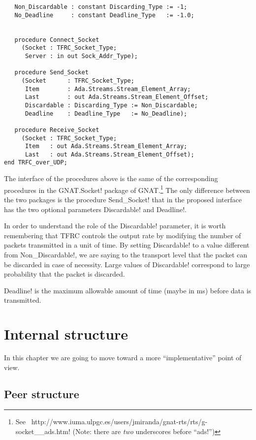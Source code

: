 \documentclass{medusabook}
\begin{document}
\begin{subappendices}
\begin{verbatim}
   Non_Discardable : constant Discarding_Type := -1;
   No_Deadline     : constant Deadline_Type   := -1.0;


   procedure Connect_Socket
     (Socket : TFRC_Socket_Type;
      Server : in out Sock_Addr_Type);

   procedure Send_Socket
     (Socket      : TFRC_Socket_Type;
      Item        : Ada.Streams.Stream_Element_Array;
      Last        : out Ada.Streams.Stream_Element_Offset;
      Discardable : Discarding_Type := Non_Discardable;
      Deadline    : Deadline_Type   := No_Deadline);

   procedure Receive_Socket
     (Socket : TFRC_Socket_Type;
      Item   : out Ada.Streams.Stream_Element_Array;
      Last   : out Ada.Streams.Stream_Element_Offset);
end TRFC_over_UDP;
\end{verbatim}
%
The interface of the procedures above is the same of the corresponding
procedures in the \ttt GNAT.Socket! package of GNAT.\footnote{See~\ttt 
http://www.iuma.ulpgc.es/users/jmiranda/gnat-rts/rts/g-socket\_\_ads.htm!
(Note: there are \emph{two} underscores before ``\ttt ads!'')}
The only difference between the two packages is the procedure \ttt
Send\_Socket! that in the proposed interface has the two optional parameters
\ttt Discardable! and \ttt Deadline!.

In order to understand the role of the \ttt Discardable! parameter, it is
worth remembering that TFRC controls the output rate by modifying the
number of packets transmitted in a unit of time.  By setting \ttt
Discardable! to a value different from \ttt Non\_Discardable!, we are
saying to the transport level that the packet can be discarded in case
of necessity.  Large  values of \ttt Discardable! correspond to large
probability that the packet is discarded.

\ttt Deadline! is the maximum allowable amount of time (maybe in ms)
before data is transmitted.

\end{subappendices}


\chapter{Internal structure}
\label{chap:2;medusa_book}

In this chapter we are going to move toward a more ``implementative''
point of view.  

\section{Peer structure}
\label{sect:2.1;medusa_book}
\end{document}
